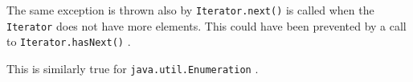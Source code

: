 The same exception is thrown also by \lstinline|Iterator.next()| \autocite{ORACLE_DOC_ITERATOR:next} is called when the \lstinline|Iterator| \autocite{ORACLE_DOC_ITERATOR_INTERFACE} does not have more elements. This could have been prevented by a call to \lstinline|Iterator.hasNext()| \autocite{ORACLE_DOC_ITERATOR:hasNext}.

This is similarly true for \lstinline|java.util.Enumeration| \autocite{ORACLE_DOC_ENUMERATION_INTERFACE}.
 
